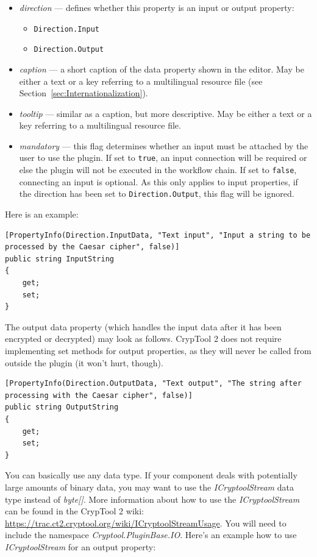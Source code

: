 \begin{itemize}
	\item \textit{direction} --- defines whether this property is an input or output property:
	\begin{itemize}
		\item \texttt{Direction.Input}
		\item \texttt{Direction.Output}
	\end{itemize}
	\item \textit{caption} --- a short caption of the data property shown in the editor. May be either a text or a key referring to a multilingual resource file (see Section~\ref{sec:Internationalization}).
	\item \textit{tooltip} --- similar as a caption, but more descriptive. May be either a text or a key referring to a multilingual resource file.
	\item \textit{mandatory} --- this flag determines whether an input must be attached by the user to use the plugin. If set to \texttt{true}, an input connection will be required or else the plugin will not be executed in the workflow chain. If set to \texttt{false}, connecting an input is optional. As this only applies to input properties, if the direction has been set to \texttt{Direction.Output}, this flag will be ignored.

\end{itemize}

Here is an example:
\clearpage

\begin{lstlisting}
[PropertyInfo(Direction.InputData, "Text input", "Input a string to be processed by the Caesar cipher", false)]
public string InputString
{
	get;
	set;
}
\end{lstlisting}

The output data property (which handles the input data after it has been encrypted or decrypted) may look as follows. CrypTool 2 does not require implementing set methods for output properties, as they will never be called from outside the plugin (it won't hurt, though).

\begin{lstlisting}
[PropertyInfo(Direction.OutputData, "Text output", "The string after processing with the Caesar cipher", false)]
public string OutputString
{
	get;
	set;
}
\end{lstlisting}

You can basically use any data type. If your component deals with potentially large amounts of binary data, you may want to use the \textit{ICryptoolStream} data type instead of \textit{byte[]}. More information about how to use the \textit{ICryptoolStream} can be found in the CrypTool 2 wiki: \url{https://trac.ct2.cryptool.org/wiki/ICryptoolStreamUsage}. You will need to include the namespace \textit{Cryptool.PluginBase.IO}. Here's an example how to use \textit{ICryptoolStream} for an output property:

